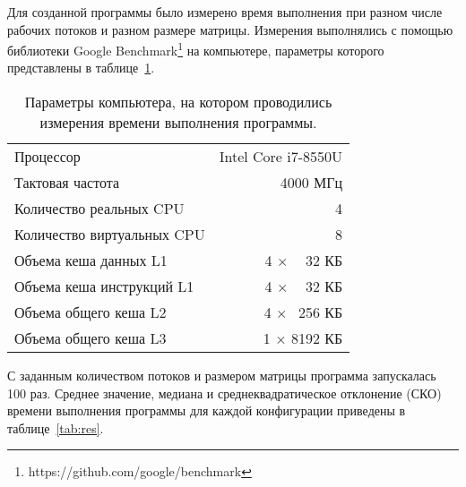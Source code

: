 \documentclass[a4paper,14pt]{extarticle}
\begin{document}
    Для созданной программы было измерено время выполнения при разном числе рабочих потоков и разном размере матрицы.
    Измерения выполнялись с помощью библиотеки Google Benchmark\footnote{https://github.com/google/benchmark} на компьютере,
    параметры которого представлены в таблице~\ref{tab:par}.
    \begin{table}[b]
        \centering
        \begin{tabular}{lr}
            \toprule
            Процессор &  Intel\textregistered{} Core\texttrademark{}  i7-8550U  \\
            Тактовая частота & 4000 МГц \\
            \midrule
            Количество реальных CPU & 4 \\
            Количество виртуальных CPU & 8 \\
            \midrule
            Объема кеша данных L1 & 4 $\times$ $\;\,\;\,$32 КБ  \\
            Объема кеша инструкций L1 & 4 $\times$ $\;\,\;\,$32 КБ  \\
            Объема общего кеша L2 & 4 $\times$ $\;\,$256 КБ \\
            Объема общего кеша L3 & 1 $\times$ 8192 КБ \\
            \bottomrule
        \end{tabular}
        \caption{Параметры компьютера, на котором проводились измерения времени выполнения программы.}
        \label{tab:par}
    \end{table}
    С заданным количеством потоков и размером матрицы программа запускалась 100 раз.
    Среднее значение, медиана и среднеквадратическое отклонение (СКО) времени выполнения программы для каждой
    конфигурации приведены в таблице~\ref{tab:res}.
\end{document}
